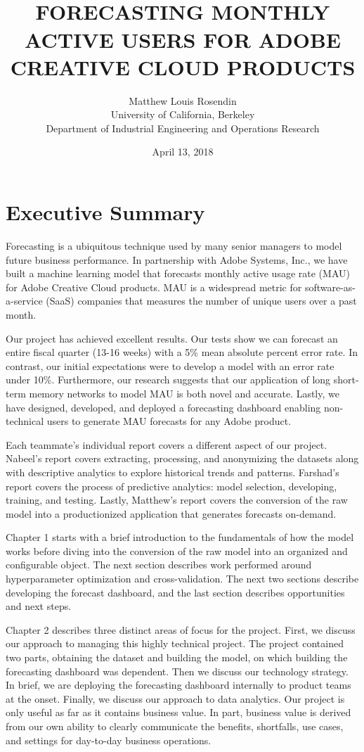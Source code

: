 \documentclass[11pt, oneside, authoryear]{report}
\title{
  \HRule{0.5pt} \\
  \LARGE \textbf{\uppercase{Forecasting Monthly Active Users for Adobe Creative Cloud Products}}
  \HRule{2pt} \\ [0.5cm]
  \vspace*{5\baselineskip}
}
\author{
  Matthew Louis Rosendin \\
  University of California, Berkeley \\
  Department of Industrial Engineering and Operations Research
}
\date{April 13, 2018}
\begin{document}
\maketitle
\newpage

\tableofcontents
\newpage

\listoffigures
\newpage

\section*{Executive Summary}
Forecasting is a ubiquitous technique used by many senior managers to model future business performance. In partnership with Adobe Systems, Inc., we have built a machine learning model that forecasts monthly active usage rate (MAU) for Adobe Creative Cloud products. MAU is a widespread metric for software-as-a-service (SaaS) companies that measures the number of unique users over a past month.

Our project has achieved excellent results. Our tests show we can forecast an entire fiscal quarter (13-16 weeks) with a 5\% mean absolute percent error rate. In contrast, our initial expectations were to develop a model with an error rate under 10\%. Furthermore, our research suggests that our application of long short-term memory networks to model MAU is both novel and accurate. Lastly, we have designed, developed, and deployed a forecasting dashboard enabling non-technical users to generate MAU forecasts for any Adobe product.

Each teammate's individual report covers a different aspect of our project. Nabeel's report covers extracting, processing, and anonymizing the datasets along with descriptive analytics to explore historical trends and patterns. Farshad's report covers the process of predictive analytics: model selection, developing, training, and testing. Lastly, Matthew's report covers the conversion of the raw model into a productionized application that generates forecasts on-demand.

Chapter 1 starts with a brief introduction to the fundamentals of how the model works before diving into the conversion of the raw model into an organized and configurable object. The next section describes work performed around hyperparameter optimization and cross-validation. The next two sections describe developing the forecast dashboard, and the last section describes opportunities and next steps.

Chapter 2 describes three distinct areas of focus for the project. First, we discuss our approach to managing this highly technical project. The project contained two parts, obtaining the dataset and building the model, on which building the forecasting dashboard was dependent. Then we discuss our technology strategy. In brief, we are deploying the forecasting dashboard internally to product teams at the onset. Finally, we discuss our approach to data analytics. Our project is only useful as far as it contains business value. In part, business value is derived from our own ability to clearly communicate the benefits, shortfalls, use cases, and settings for day-to-day business operations.
\end{document}
